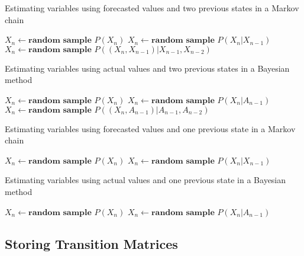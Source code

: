 \documentclass[preprint,12pt]{elsarticle}
\begin{document}
\begin{algorithm}[H] 
\caption{Estimating variables using forecasted values and two previous states in a Markov chain}
\begin{algorithmic}\label{alg:alg3}
 \STATE $X_{n} \gets \textbf{random sample } P(X_{n})$ \ENDIF
{} \STATE $X_{n} \gets \textbf{random sample } P(X_{n}|X_{n-1})$ \ENDIF
{} \STATE $X_{n} \gets \textbf{random sample } P((X_{n},X_{n-1})|X_{n-1},X_{n-2})$ \ENDIF
\ENDFOR
\end{algorithmic}
\end{algorithm}

\begin{algorithm}[H] 
\caption{Estimating variables using actual values and two previous states in a Bayesian method}
\begin{algorithmic}\label{alg:alg4}
 \STATE $X_{n} \gets \textbf{random sample } P(X_{n})$ \ENDIF
{} \STATE $X_{n} \gets \textbf{random sample } P(X_{n}|A_{n-1})$ \ENDIF
{} \STATE $X_{n} \gets \textbf{random sample } P((X_{n},A_{n-1})|A_{n-1},A_{n-2})$ \ENDIF
\ENDFOR
\end{algorithmic}
\end{algorithm}

\begin{algorithm}[H] 
\caption{Estimating variables using forecasted values and one previous state in a Markov chain}
\begin{algorithmic}\label{alg:alg5}
 \STATE $X_{n} \gets \textbf{random sample } P(X_{n})$ \ENDIF
{} \STATE $X_{n} \gets \textbf{random sample } P(X_{n}|X_{n-1})$ \ENDIF
\ENDFOR
\end{algorithmic}
\end{algorithm}

\begin{algorithm}[H] 
\caption{Estimating variables using actual values and one previous state in a Bayesian method}
\begin{algorithmic}\label{alg:alg6}
 \STATE $X_{n} \gets \textbf{random sample } P(X_{n})$ \ENDIF
{} \STATE $X_{n} \gets \textbf{random sample } P(X_{n}|A_{n-1})$ \ENDIF
\ENDFOR
\end{algorithmic}
\end{algorithm}

\subsection{Storing Transition Matrices}
\end{document}
